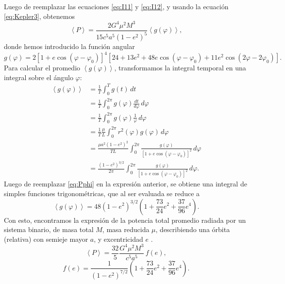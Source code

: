 Luego de reemplazar las ecuaciones \ref{eq:I11} y \ref{eq:I12}, y usando la ecuación \ref{eq:Kepler3}, obtenemos
\begin{equation*}
\left\langle P\right\rangle = \frac{2G^4\mu^2M^3}{15c^5a^5\left(1-e^2\right)^{5}}\left\langle g(\varphi)\right\rangle ,
\end{equation*}
donde hemos introducido la función angular
\begin{equation}\label{eq:Pphi}
g(\varphi)=2\left[1+e\cos(\varphi-\varphi_0)\right]^4
\left[24+13e^2+48e\cos(\varphi-\varphi_0) +11e^2\cos(2\varphi-2\varphi_0)\right].
\end{equation}
Para calcular el promedio $\left\langle g(\varphi)\right\rangle$, transformamos la integral temporal en una integral sobre el ángulo $\varphi$:
\begin{align*}
\left\langle g(\varphi)\right\rangle &= \frac{1}{T}\int_0^T g(t)\,dt \\
&= \frac{1}{T}\int_0^{2\pi} g(\varphi)\frac{dt}{d\varphi}\,d\varphi \\
&= \frac{1}{T}\int_0^{2\pi} g(\varphi)\frac{1}{\dot{\varphi}}\,d\varphi \\
&= \frac{1}{T}\frac{\mu}{L}\int_0^{2\pi} r^2(\varphi)g(\varphi)\,d\varphi \\
&= \frac{\mu a^2(1-e^2)^2}{TL}\int_0^{2\pi} \frac{g(\varphi)}{\left[1+e\cos(\varphi-\varphi_0)\right]^2}\,d\varphi \\
&= \frac{(1-e^2)^{3/2}}{2\pi}\int_0^{2\pi} \frac{g(\varphi)}{\left[1+e\cos(\varphi-\varphi_0)\right]^2}\,d\varphi.
\end{align*}
Luego de reemplazar \ref{eq:Pphi} en la expresión anterior, se obtiene una integral de simples funciones trigonométricas, que al ser evaluada se reduce a
\begin{equation*}
\left\langle g(\varphi)\right\rangle= 48(1-e^2)^{3/2}\left(1+\frac{73}{24}e^2+\frac{37}{96}e^4\right).
\end{equation*}
Con esto, encontramos la expresión de la potencia total promedio radiada por un sistema binario, de masa total $M$, masa reducida $\mu$, describiendo una órbita (relativa) con semieje mayor $a$, y excentricidad $e$ \cite{PhysRev.131.435}.
\begin{equation}\label{eq:PSbin}
\left\langle P\right\rangle =\frac{32}{5}\frac{G^4\mu^2M^3}{c^5a^5}\,f(e),
\end{equation}
\begin{equation*}
f(e)=\frac{1}{\left(1-e^2\right)^{7/2}}\left(1+\frac{73}{24}e^2+\frac{37}{96}e^4\right).
\end{equation*}
